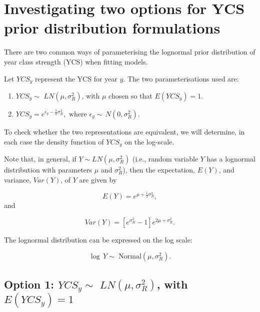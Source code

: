 \begin{appendices}\label{appendix}

\section{Investigating two options for YCS prior distribution
	formulations}\label{investigating-two-options-for-ycs-prior-distribution-formulations}

There are two common ways of parameterising the lognormal prior
distribution of year class strength (YCS) when fitting models.

Let \(YCS_y\) represent the YCS for year \(y\). The two
parameterisations used are:

\begin{enumerate}
	\def\labelenumi{\arabic{enumi}.}
	\item \(YCS_y \sim \,\, LN(\mu, \sigma^2_R)\), with \(\mu\) chosen
	so that \(E(YCS_y)=1\).
	\item \(YCS_y = e^{\epsilon_y - \frac{1}{2}\sigma^2_R},\,\, \text{where } \epsilon_y \sim \,N(0, \sigma^2_R)\).
\end{enumerate}

To check whether the two representations are equivalent, we will
determine, in each case the density function of \(YCS_y\) on the
log-scale.

Note that, in general, if \(Y \sim LN(\mu, \sigma^2_R)\) (i.e., random
variable \(Y\) has a lognormal distribution with parameters \(\mu\)
and \(\sigma^2_R\)), then the expectation, \(E(Y)\), and variance,
\(Var(Y)\), of \(Y\) are given by

\[E(Y) = e^{\mu + \frac{1}{2}\sigma^2_R},\] and

\[Var(Y) = \left[e^{\sigma^2_R}-1\right]e^{2\mu + \sigma^2_R}.\]

The lognormal distribution can be expressed on the log scale:

\[\log\, Y \sim \,\, \text{Normal}(\mu, \sigma^2_R).\]

\subsection*{\texorpdfstring{Option 1:
		\(YCS_y \sim \,\, LN(\mu, \sigma^2_R)\), with
		\(E(YCS_y)=1\)}{1.1 Option 1: YCS\_y \textbackslash{}sim \textbackslash{},\textbackslash{}, LN(\textbackslash{}mu, \textbackslash{}sigma\^{}2\_R), with E(YCS\_y)=1}}\label{option-1-ycs_y-sim-lnmu-sigma2_r-with-eycs_y1}


\end{appendices}
